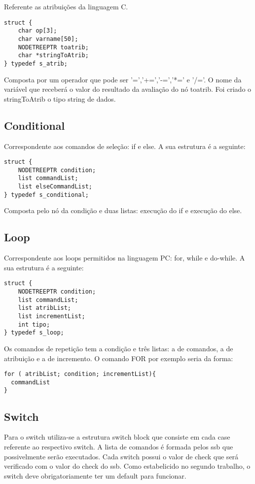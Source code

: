 \documentclass[a4paper,10pt]{article}
\begin{document}
Referente as atribuições da linguagem C. 

\begin{lstlisting}
struct {
	char op[3];
	char varname[50];
	NODETREEPTR toatrib;
	char *stringToAtrib;
} typedef s_atrib;
\end{lstlisting}

Composta por um operador que pode ser '=','+=','-=','*=' e '/='. O nome da variável que receberá o valor do resultado da avaliação do nó toatrib. Foi criado o
stringToAtrib o tipo string de dados. 

\subsection{Conditional}

Correspondente aos comandos de seleção: if e else. A sua estrutura é a seguinte:

\begin{lstlisting}
struct {
	NODETREEPTR condition;
	list commandList;
	list elseCommandList;
} typedef s_conditional;
\end{lstlisting}

Composta pelo nó da condição e duas listas: execução do if e execução do else. 

\subsection{Loop}

Correspondente aos loops permitidos na linguagem PC: for, while e do-while. A sua estrutura é a seguinte:

\begin{lstlisting}
struct {
	NODETREEPTR condition;
	list commandList;
	list atribList;
	list incrementList;
	int tipo;
} typedef s_loop;
\end{lstlisting}

Os comandos de repetição tem a condição e três listas: a de comandos, a de atribuição e a de incremento. O comando FOR por exemplo seria da forma:

\begin{lstlisting}
for ( atribList; condition; incrementList){
  commandList
}
\end{lstlisting}

\subsection{Switch}

Para o switch utiliza-se a estrutura switch block que consiste em cada case referente ao respectivo switch. A lista de comandos é formada pelos ssb que possivelmente serão executados.
Cada switch possui o valor de check que será verificado com o valor do check do ssb. Como estabelicido no segundo trabalho, o switch deve obrigatoriamente ter um default para funcionar.
\end{document}
